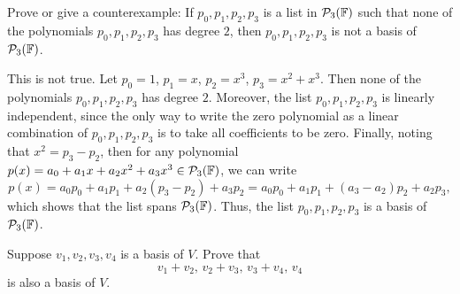 \begin{exc}
\begin{exercise}
Prove or give a counterexample: If $p_0,p_1,p_2,p_3$ is a list in $\mathcal{P}_3(\mathbb{F})$
such that none of the polynomials $p_0,p_1,p_2,p_3$ has degree $2$, then
$p_0,p_1,p_2,p_3$ is not a basis of $\mathcal{P}_3(\mathbb{F})$.
\end{exercise}
\begin{solution}
This is not true. Let $p_0=1$, $p_1=x$, $p_2=x^3$, $p_3=x^2+x^3$. Then none of
the polynomials $p_0,p_1,p_2,p_3$ has degree $2$. Moreover, the list
$p_0,p_1,p_2,p_3$ is linearly independent, since the only way to write the zero
polynomial as a linear combination of $p_0,p_1,p_2,p_3$ is to take all
coefficients to be zero. Finally, noting that $x^2=p_3-p_2$, then for any
polynomial $p(x)=a_0+a_1x+a_2x^2+a_3x^3\in\mathcal{P}_3(\mathbb{F})$, we can write
\[ p(x) = a_0p_0+a_1p_1+a_2(p_3-p_2)+a_3p_2
        = a_0p_0+a_1p_1+(a_3-a_2)p_2+a_2p_3, \]
which shows that the list spans $\mathcal{P}_3(\mathbb{F})$. Thus, the list
$p_0,p_1,p_2,p_3$ is a basis of $\mathcal{P}_3(\mathbb{F})$.
\end{solution}

\begin{exercise}
Suppose $v_1,v_2,v_3,v_4$ is a basis of $V$. Prove that
\[ v_1+v_2,\,v_2+v_3,\,v_3+v_4,\,v_4 \]
is also a basis of $V$.
\end{exercise}
\begin{solution}


\end{solution}
\end{exc}
